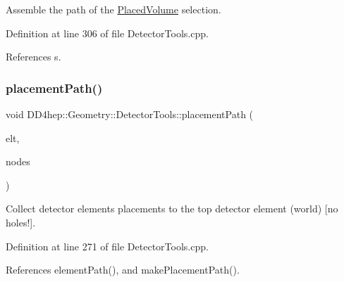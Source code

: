 Assemble the path of the \hyperlink{class_d_d4hep_1_1_geometry_1_1_placed_volume}{Placed\+Volume} selection. 



Definition at line 306 of file Detector\+Tools.\+cpp.



References s.

\hypertarget{namespace_d_d4hep_1_1_geometry_1_1_detector_tools_a4643e9605448f9652b2c95e6ef5619c3}{}\label{namespace_d_d4hep_1_1_geometry_1_1_detector_tools_a4643e9605448f9652b2c95e6ef5619c3} 
\subsubsection{\texorpdfstring{placement\+Path()}{placementPath()}\hspace{0.1cm}{\footnotesize\ttfamily [4/5]}}
{\footnotesize\ttfamily void D\+D4hep\+::\+Geometry\+::\+Detector\+Tools\+::placement\+Path (\begin{DoxyParamCaption}\item[{\hyperlink{class_d_d4hep_1_1_geometry_1_1_det_element}{Det\+Element}}]{elt,  }\item[{\hyperlink{namespace_d_d4hep_1_1_geometry_1_1_detector_tools_a6cc33285199e04dd336a33e6e62925e6}{Placement\+Path} \&}]{nodes }\end{DoxyParamCaption})}



Collect detector elements placements to the top detector element (world) \mbox{[}no holes!\mbox{]}. 



Definition at line 271 of file Detector\+Tools.\+cpp.



References element\+Path(), and make\+Placement\+Path().

\hypertarget{namespace_d_d4hep_1_1_geometry_1_1_detector_tools_ae4ebaffda73014e393cf33ea3bfe0870}{}\label{namespace_d_d4hep_1_1_geometry_1_1_detector_tools_ae4ebaffda73014e393cf33ea3bfe0870} 
